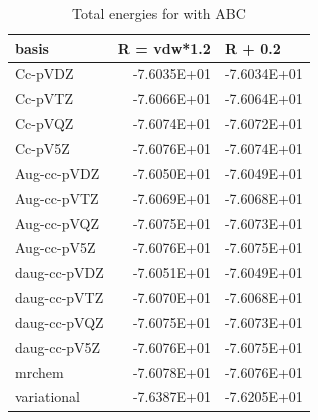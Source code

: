 \documentclass[../master_thesis.tex]{subfiles}
\begin{document}
\begin{table}[htbp]
\caption{Total energies for  with \ac{ABC}}
\begin{tabular}{|l|r|r|}
\hline
basis & \multicolumn{1}{l|}{R = vdw*1.2} & \multicolumn{1}{l|}{R + 0.2} \\ \hline
Cc-pVDZ & -7.6035E+01 & -7.6034E+01 \\ \hline
Cc-pVTZ & -7.6066E+01 & -7.6064E+01 \\ \hline
Cc-pVQZ & -7.6074E+01 & -7.6072E+01 \\ \hline
Cc-pV5Z & -7.6076E+01 & -7.6074E+01 \\ \hline
Aug-cc-pVDZ & -7.6050E+01 & -7.6049E+01 \\ \hline
Aug-cc-pVTZ & -7.6069E+01 & -7.6068E+01 \\ \hline
Aug-cc-pVQZ & -7.6075E+01 & -7.6073E+01 \\ \hline
Aug-cc-pV5Z & -7.6076E+01 & -7.6075E+01 \\ \hline
daug-cc-pVDZ & -7.6051E+01 & -7.6049E+01 \\ \hline
daug-cc-pVTZ & -7.6070E+01 & -7.6068E+01 \\ \hline
daug-cc-pVQZ & -7.6075E+01 & -7.6073E+01 \\ \hline
daug-cc-pV5Z & -7.6076E+01 & -7.6075E+01 \\ \hline
mrchem & -7.6078E+01 & -7.6076E+01 \\ \hline
variational & -7.6387E+01 & -7.6205E+01 \\ \hline
\end{tabular}
\label{tab:watrawdataabc}
\end{table}
\end{document}
